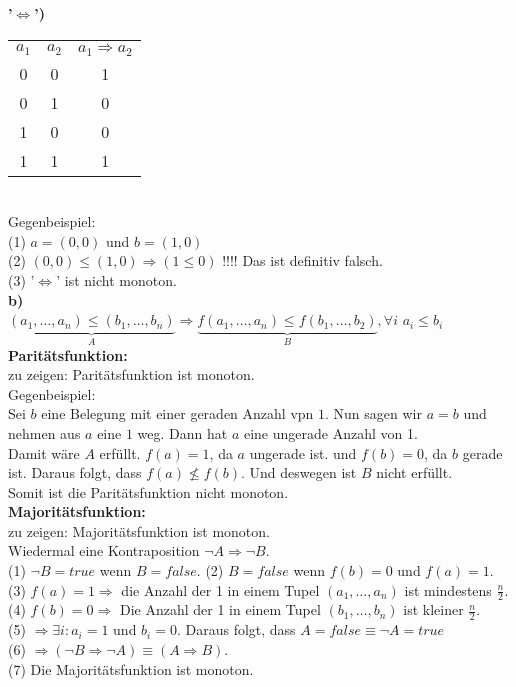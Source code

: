 \documentclass[a4paper]{scrartcl}
\begin{document}
\begin{flushleft}
		\textbf{'$\Leftrightarrow$')}\\
		\begin{tabular}{|c|c|c|}
			$a_1$ & $a_2$ & $a_1\Rightarrow a_2$\\
			0 & 0 & 1 \\
			0 & 1 & 0 \\
			1 & 0 & 0 \\
			1 & 1 & 1 \\
		 \end{tabular}\\[1em]
		 Gegenbeispiel:\\
		 (1) $a=(0,0)$ und $b=(1,0)$\\
		 (2) $(0,0)\leq(1,0)\Rightarrow(1\leq 0)$ !!!! Das ist definitiv falsch.\\
		 (3)  '$\Leftrightarrow$' ist nicht monoton.\\[1em]
		\textbf{b)}\\
		$\underbrace{(a_1,\dots,a_n)\leq(b_1,\dots,b_n)}_{A}\Rightarrow \underbrace{f(a_1,\dots,a_n)\leq f(b_1,\dots,b_2)}_{B}, \forall i$  $a_i\leq b_i$\\[1em]
		\textbf{Paritätsfunktion:}\\
		zu zeigen: Paritätsfunktion ist monoton.\\
		Gegenbeispiel:\\
		Sei $b$ eine Belegung mit einer geraden Anzahl vpn $1$. Nun sagen wir $a=b$ und nehmen aus $a$ eine $1$ weg. Dann hat $a$ eine ungerade Anzahl von 1.\\
		Damit wäre $A$ erfüllt. $f(a)=1$, da $a$ ungerade ist.  und $f(b)=0$, da $b$ gerade ist. Daraus folgt, dass $f(a) \nleq f(b)$. Und deswegen ist $B$ nicht erfüllt.\\
		Somit ist die Paritätsfunktion nicht monoton.\\[1em]

		\textbf{Majoritätsfunktion:}\\
		zu zeigen: Majoritätsfunktion ist monoton.\\
		Wiedermal eine Kontraposition $\neg A\Rightarrow\neg B$.\\
		(1) $\neg B=true$ wenn $B=false$.
		(2) $B=false$ wenn $f(b)=0$ und $f(a)=1$.\\
		(3) $f(a)=1 \Rightarrow$ die Anzahl der 1 in einem Tupel $(a_1,\dots,a_n)$ ist mindestens $\frac{n}{2}$.\\
		(4) $f(b)=0 \Rightarrow$ Die Anzahl der 1 in einem Tupel $(b_1,\dots,b_n)$ ist kleiner $\frac{n}{2}$.\\
		(5) $\Rightarrow \exists i : a_i=1$ und $b_i=0$. Daraus folgt, dass $A=false \equiv \neg A = true$\\
		(6) $\Rightarrow (\neg B \Rightarrow \neg A) \equiv (A\Rightarrow B)$.\\
		(7) Die Majoritätsfunktion ist monoton.\\[1em]
		

\end{flushleft}
\end{document}
